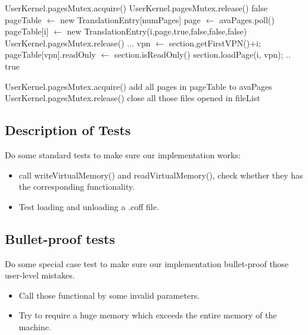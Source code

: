 \documentclass{article}
\begin{document}
	\begin{algorithm}[H]
		\begin{algorithmic}
			\State UserKernel.pagesMutex.acquire()
			\State UserKernel.pagesMutex.release()
			\Return false
			\EndIf
			\State pageTable $\leftarrow$ new TranslationEntry[numPages]
			\State page $\leftarrow$ avaPages.poll()
			\State pageTable[i] $\leftarrow$ new TranslationEntry(i,page,true,false,false,false)
			\EndFor
			\State UserKernel.pagesMutex.release()
			\State ...
			\State vpn $\leftarrow$ section.getFirstVPN()+i;
			\State pageTable[vpn].readOnly $\leftarrow$ section.isReadOnly()
			\State section.loadPage(i, vpn);
			\State ..
			\State \Return true
			\EndProcedure
		\end{algorithmic}
	\end{algorithm}
    \begin{algorithm}[H]
		\begin{algorithmic}
			\Procedure {unloadSections()}{}
			\State UserKernel.pagesMutex.acquire()
			\State add all pages in pageTable to avaPages
			\State UserKernel.pagesMutex.release()
			\State close all those files opened in fileList
			\EndProcedure
		\end{algorithmic}
	\end{algorithm}
	\subsection{Description of Tests}
	Do some standard tests to make sure our implementation works:
	
	\begin{itemize}
		\item call writeVirtualMemory() and readVirtualMemory(), check whether they has the corresponding functionality.
		\item Test loading and unloading a .coff file.
	\end{itemize}
	
	\subsection*{Bullet-proof tests}
	Do some special case test to make sure our implementation bullet-proof those user-level mistakes.
	
	\begin{itemize}
		\item Call those functional by some invalid parameters.
		\item Try to require a huge memory which exceeds the entire memory of the machine.
	\end{itemize}
\end{document}
